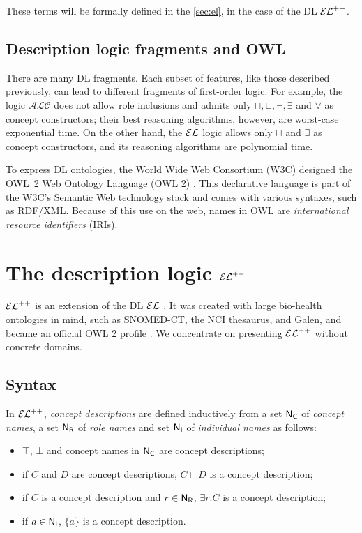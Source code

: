These terms will be formally defined in the \autoref{sec:el}, in the case of the DL $\mathcal{EL}^{++}$.

\subsection{Description logic fragments and OWL}

There are many DL fragments. Each subset of features, like those described previously, can lead to different fragments of first-order logic. For example, the logic $\mathcal{ALC}$ does not allow role inclusions and admits only $\sqcap, \sqcup, \lnot, \exists$ and $\forall$ as concept constructors; their best reasoning algorithms, however, are worst-case exponential time. On the other hand, the $\mathcal{EL}$ logic allows only $\sqcap$ and $\exists$ as concept constructors, and its reasoning algorithms are polynomial time.

To express DL ontologies, the World Wide Web Consortium (W3C) designed the OWL~2 Web Ontology Language (OWL 2) \citep{owl2}. This declarative language is part of the W3C's Semantic Web technology stack and comes with various syntaxes, such as RDF/XML. Because of this use on the web, names in OWL are \emph{international resource identifiers} (IRIs).

\section{The description logic \texorpdfstring{$\mathcal{EL}^{++}$}{𝓔𝓛++}}
\label{sec:el}

$\mathcal{EL}^{++}$ is an extension of the DL $\mathcal{EL}$ \citep{Baader2005a}. It was created with large bio-health ontologies in mind, such as SNOMED-CT, the NCI thesaurus, and Galen, and became an official OWL 2 profile \citep{owl2}. We concentrate on presenting $\mathcal{EL}^{++}$ without concrete domains.

\subsection{Syntax}
In $\mathcal{EL}^{++}$, \emph{concept descriptions} are defined inductively from a set $\mathsf{N_C}$ of \emph{concept names}, a set $\mathsf{N_R}$ of \emph{role names} and set $\mathsf{N_I}$ of \emph{individual names} as follows:
\begin{itemize}
	\item $\top$, $\bot$ and concept names in $\mathsf{N_C}$ are concept descriptions;
	\item if $C$ and $D$ are concept descriptions, $C \sqcap D$ is a concept description;
	\item if $C$ is a concept description and $r \in \mathsf{N_R}$, $\exists r.C$ is a concept description;
	\item if $a \in \mathsf{N_I}$, $\{a\}$ is a concept description.
\end{itemize}

